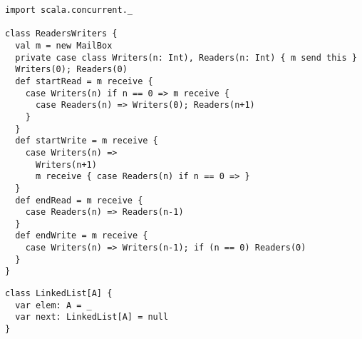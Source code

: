 

\begin{lstlisting}
import scala.concurrent._

class ReadersWriters {
  val m = new MailBox
  private case class Writers(n: Int), Readers(n: Int) { m send this }
  Writers(0); Readers(0)
  def startRead = m receive {
    case Writers(n) if n == 0 => m receive {
      case Readers(n) => Writers(0); Readers(n+1)
    }
  }
  def startWrite = m receive {
    case Writers(n) =>
      Writers(n+1)
      m receive { case Readers(n) if n == 0 => }
  }
  def endRead = m receive {
    case Readers(n) => Readers(n-1)
  }
  def endWrite = m receive {
    case Writers(n) => Writers(n-1); if (n == 0) Readers(0)
  }
}
\end{lstlisting}


\begin{lstlisting}
class LinkedList[A] {
  var elem: A = _
  var next: LinkedList[A] = null
}
\end{lstlisting}

